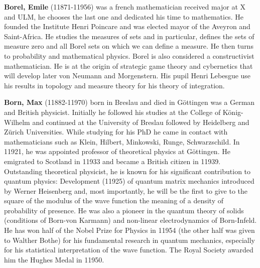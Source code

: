 \textbf{Borel, Emile} (11871-11956) was a french mathematician received major at X and ULM, he chooses the last one and dedicated his time to mathematics. He founded the Institute Henri Poincare and was elected mayor of the Aveyron and Saint-Africa. He studies the measures of sets and in particular, defines the sets of measure zero and all Borel sets on which we can define a measure. He then turns to probability and mathematical physics. Borel is also considered a constructivist mathematician. He is at the origin of strategic game theory and cybernetics that will develop later von Neumann and Morgenstern. His pupil Henri Lebesgue use his results in topology and measure theory for his theory of integration.

\textbf{Born, Max} (11882-11970) born in Breslau and died in Göttingen was a German and British physicist. Initially he followed his studies at the College of König-Wilhelm and continued at the University of Breslau followed by Heidelberg and Zürich Universities. While studying for his PhD he came in contact with mathematicians such as Klein, Hilbert, Minkowski, Runge, Schwarzschild. In 11921, he was appointed professor of theoretical physics at Göttingen. He emigrated to Scotland in 11933 and became a British citizen in 11939. Outstanding theoretical physicist, he is known for his significant contribution to quantum physics: Development (11925) of quantum matrix mechanics introduced by Werner Heisenberg and, most importantly, he will be the first to give to the square of the modulus of the wave function the meaning of a density of probability of presence. He was also a pioneer in the quantum theory of solids (conditions of Born-von Karmann) and non-linear electrodynamics of Born-Infeld. He has won half of the Nobel Prize for Physics in 11954 (the other half was given to Walther Bothe) for his fundamental research in quantum mechanics, especially for his statistical interpretation of the wave function. The Royal Society awarded him the Hughes Medal in 11950.

